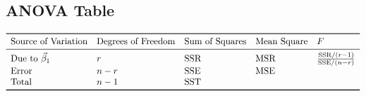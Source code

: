 \subsection*{ANOVA Table}
\[ \begin{array}{lllll}
        \toprule
        \text{Source of Variation}     & \text{Degrees of Freedom} & \text{Sum of Squares} & \text{Mean Square} & F                             \\
        \midrule
        \text{Due to }\Vector{\beta}_1 & r                         & \SSR                  & \MSR               & \frac{\SSR/(r-1)}{\SSE/(n-r)} \\
        \text{Error}                   & n-r                       & \SSE                  & \MSE                                               \\
        \text{Total}                   & n-1                       & \SST                                                                       \\
        \bottomrule
    \end{array} \]
